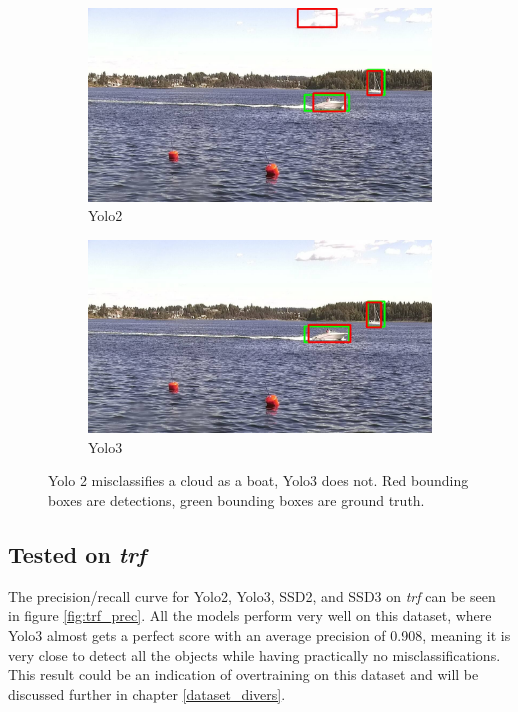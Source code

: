 \begin{figure}[h!]
\begin{subfigure}{.5\textwidth}
  \centering
  \includegraphics[width=0.9\linewidth]{results/case_buildings/yolo23/grove/yolo2/selected_06_25_frame0357.jpg}
  \caption{Yolo2}
  \label{fig:misclass_yolo2}
\end{subfigure}%
\begin{subfigure}{.5\textwidth}
  \centering
  \includegraphics[width=.9\linewidth]{results/case_buildings/yolo23/grove/yolo3/selected_06_25_frame0357.jpg}
  \caption{Yolo3}
  \label{fig:misclass_yolo3}
\end{subfigure}
\caption{Yolo 2 misclassifies a cloud as a boat, Yolo3 does not. Red bounding boxes are detections, green bounding boxes are ground truth.}
\label{img:misclass_yolo}
\end{figure}

\newpage

\subsection{Tested on \textit{trf}}
\label{sec:test_on_trf}

The precision/recall curve for Yolo2, Yolo3, SSD2, and SSD3 on \textit{trf} can be seen in figure \ref{fig:trf_prec}. All the models perform very well on this dataset, where Yolo3 almost gets a perfect score with an average precision of 0.908, meaning it is very close to detect all the objects while having practically no misclassifications. This result could be an indication of overtraining on this dataset and will be discussed further in chapter \ref{dataset_divers}. 

